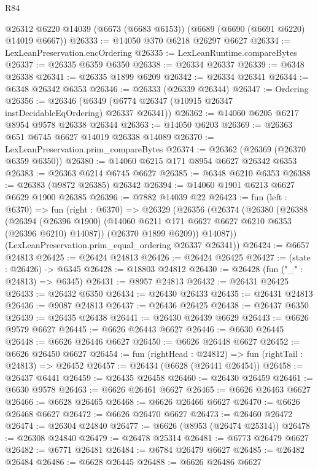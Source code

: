 \begin{lexlean}{R84}
\begin{coremodule}
    @26312
    @6220
    @14039
    (@6673 (@6683 @6153))
    (@6689 (@6690 (@6691 @6220) @14019 @6667))
@26333 := @14050 @370 @6218 @26297 @6627
@26334 := LexLeanPreservation.encOrdering
@26335 := LexLeanRuntime.compareBytes
@26337 := @26335 @6359 @6350
@26338 := @26334 @26337
@26339 := @6348 @26338
@26341 := @26335 @1899 @6209
@26342 := @26334 @26341
@26344 := @6348 @26342 @6353
@26346 := @26333 (@26339 @26344)
@26347 := Ordering
@26356 := @26346 (@6349 (@6774 @26347 (@10915 @26347 instDecidableEqOrdering) @26337 @26341))
@26362 := @14060 @6205 @6217 @8954 @9578 @26338 @26344
@26363 := @14050 @6203
@26369 := @26363 @651 @6745 @6627 @14019 @26338 @14089
@26370 := LexLeanPreservation.prim_compareBytes
@26374 := @26362 (@26369 (@26370 @6359 @6350))
@26380 := @14060 @6215 @171 @8954 @6627 @26342 @6353
@26383 := @26363 @6214 @6745 @6627
@26385 := @6348 @6210 @6353
@26388 := @26383 (@9872 @26385) @26342
@26394 := @14060 @1901 @6213 @6627 @6629 @1900 @26385
@26396 := @7882 @14039 @22
@26423 := fun (left : @6370) =>
  fun (right : @6370) =>
  @26329
    (@26356
      (@26374
        (@26380
          (@26388
            (@26394
              (@26396 @1900)
              (@14060 @6211 @171 @6627 @6627 @6210 @6353 (@26396 @6210) @14087))
            (@26370 @1899 @6209))
          @14087))
      (LexLeanPreservation.prim_equal_ordering @26337 @26341))
@26424 := @6657 @24813
@26425 := @26424 @24813
@26426 := @26424 @26425
@26427 := (state : @26426) -> @6345
@26428 := @18803 @24812
@26430 := @26428 (fun ("_" : @24813) => @6345)
@26431 := @8957 @24813
@26432 := @26431 @26425
@26433 := @26432 @6350
@26434 := @26430 @26433
@26435 := @26431 @24813
@26436 := @9087 @24813
@26437 := @26436 @26425
@26438 := @26437 @6350
@26439 := @26435 @26438
@26441 := @26430 @26439 @6629
@26443 := @6626 @9579 @6627
@26445 := @6626 @26443 @6627
@26446 := @6630 @26445
@26448 := @6626 @26446 @6627
@26450 := @6626 @26448 @6627
@26452 := @6626 @26450 @6627
@26454 := fun (rightHead : @24812) => fun (rightTail : @24813) => @26452
@26457 := @26434 (@6628 (@26441 @26454))
@26458 := @26437 @6441
@26459 := @26435 @26458
@26460 := @26430 @26459
@26461 := @6630 @9578
@26463 := @6626 @26461 @6627
@26465 := @6626 @26463 @6627
@26466 := @6628 @26465
@26468 := @6626 @26466 @6627
@26470 := @6626 @26468 @6627
@26472 := @6626 @26470 @6627
@26473 := @26460 @26472
@26474 := @26304 @24840
@26477 := @6626 (@8953 (@26474 @25314))
@26478 := @26308 @24840
@26479 := @26478 @25314
@26481 := @6773 @26479 @6627
@26482 := @6771 @26481
@26484 := @6784 @26479 @6627
@26485 := @26482 @26484
@26486 := @6628 @26445
@26488 := @6626 @26486 @6627

\end{coremodule}
\end{lexlean}
